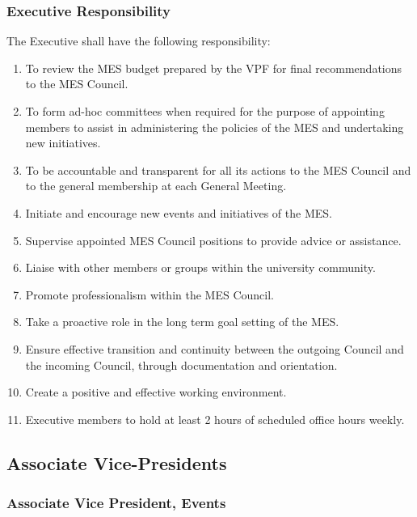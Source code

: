 \subsubsection{Executive
 Responsibility}
\label{executive-responsibility}
The Executive shall have the following responsibility:

\begin{enumerate}
 \item
  To review the MES budget prepared by the VPF for final recommendations
  to the MES Council.
 \item
  To form ad-hoc committees when required for the purpose of appointing
  members to assist in administering the policies of the MES and
  undertaking new initiatives.
 \item
  To be accountable and transparent for all its actions to the MES
  Council and to the general membership at each General Meeting.
 \item
  Initiate and encourage new events and initiatives of the MES.
 \item
  Supervise appointed MES Council positions to provide advice or
  assistance.
 \item
  Liaise with other members or groups within the university community.
 \item
  Promote professionalism within the MES Council.
 \item
  Take a proactive role in the long term goal setting of the MES.
 \item
  Ensure effective transition and continuity between the outgoing
  Council and the incoming Council, through documentation and
  orientation.
 \item
  Create a positive and effective working environment.
 \item
  Executive members to hold at least 2 hours of scheduled office hours
  weekly.

\end{enumerate}

\subsection{Associate
 Vice-Presidents}
\label{associate-vice-presidents}

\subsubsection{Associate Vice President,
 Events}
\label{associate-vice-president-events}

